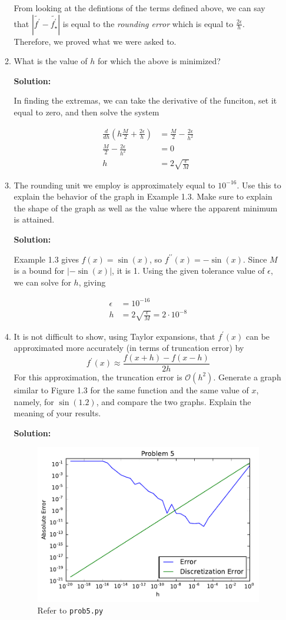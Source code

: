 \documentclass[12pt]{article}
\begin{document}
\begin{enumerate}
\begin{enumerate}
From looking at the defintions of the terms defined above, we can say that
$\left| \widetilde{f^{\prime}} - \widetilde{f^{\prime}_{\star}} \right| $ is equal
to the {\em rounding error} which is equal to $\frac{2\epsilon}{h}$. Therefore,
we proved what we were asked to.

\item What is the value of $h$ for which the above is minimized?

{\bf Solution:}

In finding the extremas, we can take the derivative of the funciton, set it equal to zero, and then solve the system

\begin{align*}
\frac{d}{dh}\left(h\frac{M}{2} + \frac{2\epsilon}{h}\right) &= \frac{M}{2} - \frac{2\epsilon}{h^{2}}\\
\frac{M}{2} - \frac{2\epsilon}{h^{2}} &= 0\\
h &= 2\sqrt{\frac{\epsilon}{M}}
\end{align*}

\item The rounding unit we employ is approximately equal to $10^{-16}$. Use this
to explain the behavior of the graph in Example 1.3. Make sure to explain the shape
of the graph as well as the value where the apparent minimum is attained.

{\bf Solution:}

Example 1.3 gives $f(x) = \sin(x)$, so $f^{\prime\prime}(x) = -\sin(x)$. Since $M$ is a bound
for $\left| -\sin(x)\right|$, it is 1. Using the given tolerance value of $\epsilon$, we can solve
for $h$, giving

\begin{align*}
\epsilon &= 10^{-16}\\
h &= 2\sqrt{\frac{\epsilon}{M}} = 2\cdot 10^{-8}
\end{align*}

\item It is not difficult to show, using Taylor expansions, that $f^{\prime}(x)$ can
be approximated more accurately (in terms of truncation error) by
\[
f^{\prime}(x) \approx \frac{f(x+h) - f(x-h)}{2h}
\]
For this approximation, the truncation error is $\mathcal{O}\left(h^{2}\right)$.
Generate a graph similar to Figure 1.3 for the same function and the same value
of $x$, namely, for $\sin(1.2)$, and compare the two graphs. Explain the meaning
of your results.

{\bf Solution:}

\begin{figure}[H]
  \centering
  \includegraphics[width=.5\textwidth]{./hw1_prob5.pdf}
  \caption{Refer to {\tt prob5.py}}
  \label{fig:prob5}
\end{figure}


\end{enumerate}
\end{enumerate}
\end{document}
